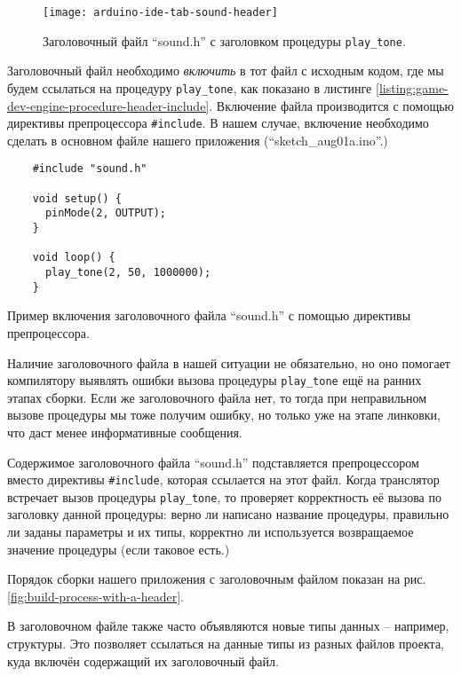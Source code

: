 \documentclass[../sparc.tex]{subfiles}
\begin{document}
\begin{figure}[ht]
  \centering
  \texttt{[image: arduino-ide-tab-sound-header]}
  \caption{Заголовочный файл ``sound.h'' с заголовком процедуры
    \texttt{play_tone}.}
  \label{fig:arduino-ide-tab-sound-header}
\end{figure}

Заголовочный файл необходимо \emph{включить} в тот файл с исходным кодом, где мы
будем ссылаться на процедуру \texttt{play_tone}, как показано в
листинге \ref{listing:game-dev-engine-procedure-header-include}.  Включение
файла производится с помощью директивы препроцессора \texttt{#include}.
В нашем случае, включение необходимо сделать в основном файле нашего приложения
(``sketch\_aug01a.ino''.)

\begin{listing}[H]
  \begin{verbatim}
    #include "sound.h"

    void setup() {
      pinMode(2, OUTPUT);
    }

    void loop() {
      play_tone(2, 50, 1000000);
    }
  \end{verbatim}
  \label{listing:game-dev-engine-procedure-header-include}
  \caption{Пример включения заголовочного файла ``sound.h'' с помощью директивы
    препроцессора.}
\end{listing}

Наличие заголовочного файла в нашей ситуации не обязательно, но оно помогает
компилятору выявлять ошибки вызова процедуры \texttt{play_tone} ещё на
ранних этапах сборки.  Если же заголовочного файла нет, то тогда при
неправильном вызове процедуры мы тоже получим ошибку, но только уже на этапе
линковки, что даст менее информативные сообщения.

Содержимое заголовочного файла ``sound.h'' подставляется препроцессором вместо
директивы \texttt{#include}, которая ссылается на этот файл.  Когда
транслятор встречает вызов процедуры \texttt{play_tone}, то проверяет
корректность её вызова по заголовку данной процедуры: верно ли написано название
процедуры, правильно ли заданы параметры и их типы, корректно ли используется
возвращаемое значение процедуры (если таковое есть.)


Порядок сборки нашего приложения с заголовочным файлом показан на
рис. \ref{fig:build-process-with-a-header}.

В заголовочном файле также часто объявляются новые типы данных -- например,
структуры.  Это позволяет ссылаться на данные типы из разных файлов проекта,
куда включён содержащий их заголовочный файл.
\end{document}
